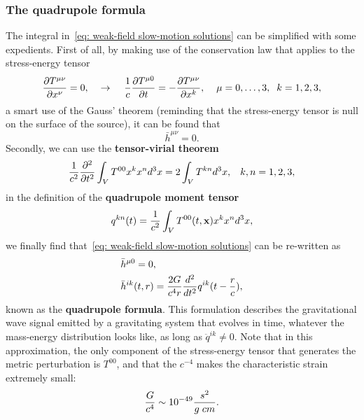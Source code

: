 \subsubsection{The quadrupole formula}
The integral in~\eqref{eq: weak-field slow-motion solutions} can be simplified with some expedients. 
First of all, by making use of the conservation law that applies to the stress-energy tensor
\[
    \frac{\partial T^{\mu\nu}}{\partial x^\nu}=0, \hspace{4mm} \to \hspace{4mm} \frac{1}{c}\frac{\partial T^{\mu 0}}{\partial t} = - \frac{\partial T^{\mu\nu}}{\partial x^k}, \hspace{4mm} \mu=0,\dots,3,\hspace{2mm} k=1,2,3,
\]
a smart use of the Gauss' theorem (reminding that the stress-energy tensor is null on the surface of the source), it can be found that 
\[
    \bar{h}^{\mu\nu}=0.
\]
Secondly, we can use the \textbf{tensor-virial theorem}
\begin{equation}
    \frac{1}{c^2}\frac{\partial^2}{\partial t^2}\int_V T^{00}x^kx^nd^3x = 2\int_V T^{kn}d^3x, \hspace{3mm} k,n=1,2,3,
    \notag
\end{equation}
in the definition of the \textbf{quadrupole moment tensor}
\begin{equation}
    q^{kn}(t) = \frac{1}{c^2}\int_VT^{00}(t,\mathbf{x})x^kx^nd^3x,
    \notag
\end{equation}
we finally find that~\eqref{eq: weak-field slow-motion solutions} can be re-written as
\begin{align}
   &\bar{h}^{\mu 0} =0,\notag\\
   &\bar{h}^{ik}(t,r) = \frac{2G}{c^4r}\frac{d^2}{dt^2}q^{ik}(t-\frac{r}{c}),
    \label{eq: quadrupole formula}
\end{align}
known as the \textbf{quadrupole formula}.
This formulation describes the gravitational wave signal emitted by a gravitating system that evolves in time, whatever the mass-energy distribution looks like, as long as $\ddot{q}^{ik}\not = 0$.
Note that in this approximation, the only component of the stress-energy tensor that generates the metric perturbation is $T^{00}$, and that the $c^{-4}$ makes the characteristic strain extremely small:
\[
    \frac{G}{c^4}\sim 10^{-49}\frac{s^2}{g\hspace{1mm}cm}.
\]


